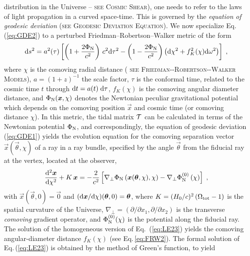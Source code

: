{distribution in the Universe -- {\scshape{\footnotesize see} \gls{Cosmic
  Shear}}), one needs to refer to the laws of light propagation in a
curved space-time. This is governed by the {\it equation of geodesic
deviation} ({\scshape{\footnotesize see} \gls{Geodesic Deviation Equation}}).
We now specialize Eq.\,(\ref{eq:GDE2}) to a
perturbed Friedman--Robertson--Walker metric of the form
%
\begin{equation}
  \d s^2 = a^2(\tau)\left[
    \left(1+\frac{2\Phi_{\rm N}}{c^2}\right)\,c^2\d\tau^2-
    \left(1-\frac{2\Phi_{\rm N}}{c^2}\right)
    \left(\d \chi^2+f_K^2(\chi)\d\omega^2\right)
  \right]\;,
\label{eq:LE22}
\end{equation}
%
where $\chi$ is the comoving radial distance ({\scshape{\footnotesize
    see} \gls{Friedman--Robertson--Walker Models}}), $a=(1+z)^{-1}$ the
scale factor, 
$\tau$ is the conformal time, related to the cosmic
time $t$ through $\d t=a(t)\;\d \tau$, $f_K(\chi)$ is the comoving
angular diameter 
distance, and $\Phi_{\rm N}(\vec x,\chi)$
denotes the Newtonian peculiar gravitational potential which depends on the
comoving position $\vec x$ and cosmic time (or comoving distance $\chi$).
In this metric, the tidal matrix ${\cal T}$ can be calculated in terms of the
Newtonian potential $\Phi_{\rm N}$, and correspondingly,
the equation of geodesic deviation (\ref{eq:GDE1})
yields the evolution equation for the comoving separation vector $\vec
x(\vec\theta,\chi)$ of a ray in a ray bundle, specified by the angle
$\vec\theta$ from the fiducial ray at the vertex, located at the 
observer, 
%
\begin{equation} 
\frac{\d^2\vec x}{\d \chi^2} +
K\,\vec x = -\frac{2}{c^2} \eck{ \nabla_\perp\Phi_{\rm N}\rund{\vec
x(\vec\theta,\chi),\chi} -\nabla_\perp\Phi_{\rm N}^{(0)}\rund{\chi}} \;,
\label{eq:LE23}
\end{equation}
%
with $\vec x(\vec\theta,0)=\vec 0$ and $(\d\vec
x/\d\chi)(\vec\theta,0)=\vec\theta$,  
where $K=(H_0/c)^2\,(\Omega_{\rm tot}-1)$ is the spatial curvature of
the Universe, $\nabla_\perp=(\partial/\partial x_1,\partial/\partial
x_2)$ is the transverse {\it comoving} gradient operator, and
$\Phi^{(0)}_{\rm N}(\chi)$ is the potential along the fiducial ray.
The solution of the homogeneous version of Eq.\, (\ref{eq:LE23})
yields the comoving angular-diameter distance $f_K(\chi)$ (see
Eq.\,\ref{eq:FRW2}). The
formal solution of Eq.\,(\ref{eq:LE23}) is obtained by the method of Green's
function, to yield
%
}
